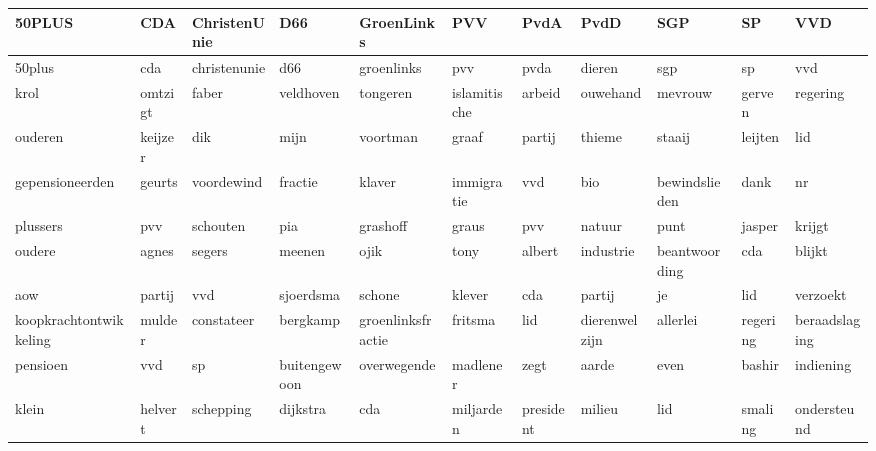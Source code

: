 \begin{tabular}{lllllllllll}
\toprule
                 50PLUS &      CDA &  ChristenUnie &           D66 &         GroenLinks &           PVV &       PvdA &           PvdD &            SGP &        SP &            VVD \\
\midrule
                 50plus &      cda &  christenunie &           d66 &         groenlinks &           pvv &       pvda &         dieren &            sgp &        sp &            vvd \\
                   krol &  omtzigt &         faber &     veldhoven &           tongeren &  islamitische &     arbeid &       ouwehand &        mevrouw &    gerven &       regering \\
                ouderen &  keijzer &           dik &          mijn &           voortman &         graaf &     partij &         thieme &         staaij &   leijten &            lid \\
        gepensioneerden &   geurts &    voordewind &       fractie &             klaver &    immigratie &        vvd &            bio &  bewindslieden &      dank &             nr \\
               plussers &      pvv &      schouten &           pia &           grashoff &         graus &        pvv &         natuur &           punt &    jasper &         krijgt \\
                 oudere &    agnes &        segers &        meenen &               ojik &          tony &     albert &      industrie &  beantwoording &       cda &         blijkt \\
                    aow &   partij &           vvd &     sjoerdsma &             schone &        klever &        cda &         partij &             je &       lid &       verzoekt \\
 koopkrachtontwikkeling &   mulder &    constateer &      bergkamp &  groenlinksfractie &       fritsma &        lid &  dierenwelzijn &       allerlei &  regering &  beraadslaging \\
               pensioen &      vvd &            sp &  buitengewoon &        overwegende &      madlener &       zegt &          aarde &           even &    bashir &      indiening \\
                  klein &  helvert &     schepping &      dijkstra &                cda &     miljarden &  president &         milieu &            lid &   smaling &    ondersteund \\
\bottomrule
\end{tabular}
